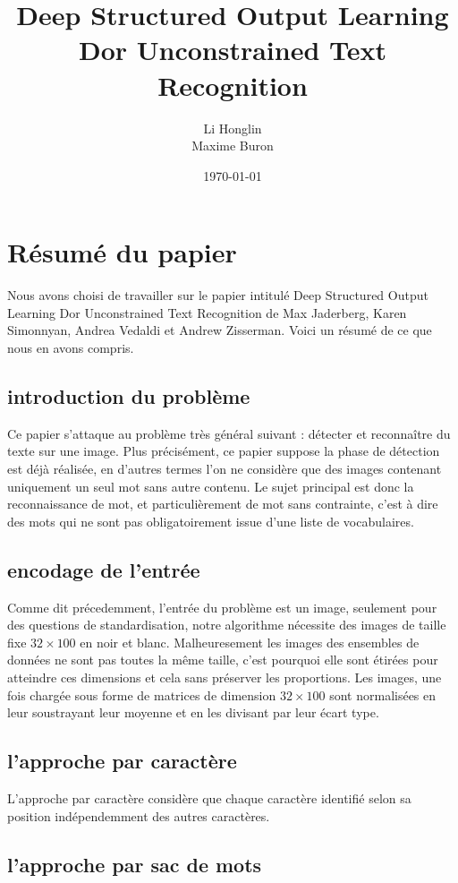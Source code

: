 \documentclass{article}
\author{Li Honglin \\Maxime Buron}
\date{\today}
\title{Deep Structured Output Learning Dor Unconstrained Text Recognition}
\begin{document}
\maketitle
\tableofcontents
\section{Résumé du papier}
Nous avons choisi de travailler sur le papier intitulé Deep Structured Output Learning Dor Unconstrained Text Recognition de Max Jaderberg, Karen Simonnyan, Andrea Vedaldi et Andrew Zisserman. Voici un résumé de ce que nous en avons compris.
\subsection{introduction du problème}
Ce papier s'attaque au problème très général suivant : détecter et reconnaître du texte sur une image. Plus précisément, ce papier suppose la phase de détection est déjà réalisée, en d'autres termes l'on ne considère que des images contenant uniquement un seul mot sans autre contenu. Le sujet principal est donc la reconnaissance de mot, et particulièrement de mot sans contrainte, c'est à dire des mots qui ne sont pas obligatoirement issue d'une liste de vocabulaires.

\subsection{encodage de l'entrée}
Comme dit précedemment, l'entrée du problème est un image, seulement pour des questions de standardisation, notre algorithme nécessite des images de taille fixe $32\times100$ en noir et blanc. Malheuresement les images des ensembles de données ne sont pas toutes la même taille, c'est pourquoi elle sont étirées pour atteindre ces dimensions et cela sans préserver les proportions. Les images, une fois chargée sous forme de matrices de dimension $32 \times 100$ sont normalisées en leur soustrayant leur moyenne et en les divisant par leur écart type. 

\subsection{l'approche par caractère}
L'approche par caractère considère que chaque caractère identifié selon sa position indépendemment des autres caractères. 

\subsection{l'approche par sac de mots}
\end{document}
